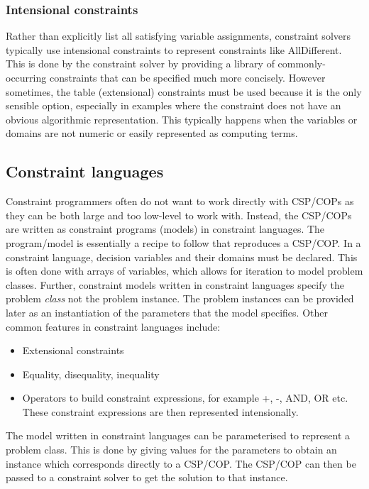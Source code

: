 \documentclass[CS4402-Notes.tex]{subfiles}
\begin{document}
\subsubsection{Intensional constraints}
Rather than explicitly list all satisfying variable assignments, constraint solvers typically use intensional constraints to represent constraints like AllDifferent. This is done by the constraint solver by providing a library of commonly-occurring constraints that can be specified much more concisely. 
\n
However sometimes, the table (extensional) constraints must be used because it is the only sensible option, especially in examples where the constraint does not have an obvious algorithmic representation. This typically happens when the variables or domains are not numeric or easily represented as computing terms. 

\subsection{Constraint languages}
Constraint programmers often do not want to work directly with CSP/COPs as they can be both large and too low-level to work with. Instead, the CSP/COPs are written as constraint programs (models) in constraint languages. The program/model is essentially a recipe to follow that reproduces a CSP/COP. 
\n
In a constraint language, decision variables and their domains must be declared. This is often done with arrays of variables, which allows for iteration to model problem classes. Further, constraint models written in constraint languages specify the problem \textit{class} not the problem instance. The problem instances can be provided later as an instantiation of the parameters that the model specifies. Other common features in constraint languages include:
\begin{itemize}
\item Extensional constraints
\item Equality, disequality, inequality
\item Operators to build constraint expressions, for example +, -, AND, OR etc. These constraint expressions are then represented intensionally. 
\end{itemize}
The model written in constraint languages can be parameterised to represent a problem class. This is done by giving values for the parameters to obtain an instance which corresponds directly to a CSP/COP. The CSP/COP can then be passed to a constraint solver to get the solution to that instance.
\end{document}
